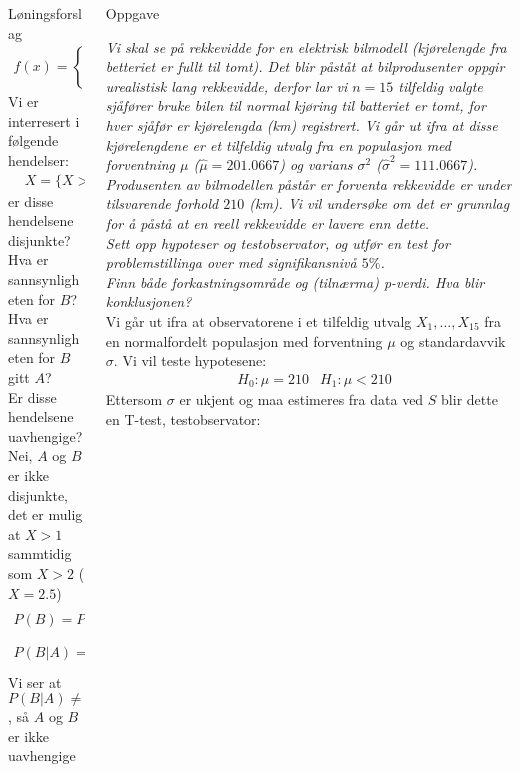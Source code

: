 \documentclass[final,hyperref={pdfpagelabels=false}]{beamer}
\newcommand{\oppgave}[2]
{\center\normalsize Oppgave\\
	{\footnotesize\raggedright \textit{#1}\\#2\\}}
\newcommand{\matte}[1]{\vspace{-3mm}\begin{align*}#1\end{align*}}
\begin{document}
\begin{frame}{}
\begin{columns}[t]
\begin{column}{.33\linewidth}
\begin{block}{Løningsforslag}
{					\matte{f(x)=\begin{cases}
							\frac{2}{9}x,&0<x<3\\
							0,&\text{ellers}
						\end{cases}}
					Vi er interresert i følgende hendelser:
					\matte{&X=\{X>1\} &\text{og}& &B=\{X>2\}}
					er disse hendelsene disjunkte?\\
					Hva er sannsynligheten for $B$?\\
					Hva er sannsynligheten for $B$ gitt $A$?\\
					Er disse hendelsene uavhengige?}
				{Nei, $A$ og $B$ er ikke disjunkte, det er mulig at $X>1$ sammtidig som $X>2$ ($X=2.5$)
					\matte{P(B)=P(X>2)=\int_2^3f(x)\,dx=\int_2^3\frac{2}{9}x\,dx\left[\frac{1}{9}x^2\right]_2^3=1-\frac{4}{9}=\frac{5}{9}\\
						P(B|A)=\frac{P(B\cap A)}{P(A)}=\frac{P(A|B)P(B)}{P(A)}=\frac{1\cdot P(B)}{P(A)}=\frac{\frac{5}{9}}{\int_1^3\frac{1}{9}x\,dx}=\frac{5}{8}}
					Vi ser at $P(B|A)\neq P(B)$, så $A$ og $B$ er ikke uavhengige}
			\end{block}
		\end{column}
		\begin{column}{.33\linewidth}
			\begin{block}{}
				\oppgave{Vi skal se på rekkevidde for en elektrisk bilmodell (kjørelengde fra betteriet er fullt til tomt).
					Det blir påståt at bilprodusenter oppgir urealistisk lang rekkevidde, derfor lar vi $n=15$ tilfeldig valgte sjåfører bruke bilen til normal kjøring til batteriet er tomt, for hver sjåfør er kjørelengda (km) registrert.
					Vi går ut ifra at disse kjørelengdene er et tilfeldig utvalg fra en populasjon med forventning $\mu$ ($\hat \mu=201.0667$) og varians $\sigma^2$ ($\hat \sigma^2 = 111.0667$).
					Produsenten av bilmodellen påstår er forventa rekkevidde er under tilsvarende forhold $210$ (km).
					Vi vil undersøke om det er grunnlag for å påstå at en reell rekkevidde er lavere enn dette.\\
					Sett opp hypoteser og testobservator, og utfør en test for problemstillinga over med signifikansnivå $5\%$.\\
					Finn både forkastningsområde og (tilnærma) p-verdi.
					Hva blir konklusjonen?}
				{Vi går ut ifra at observatorene i et tilfeldig utvalg $X_1,\ldots,X_{15}$ fra en normalfordelt populasjon med forventning $\mu$ og standardavvik $\sigma$.
					Vi vil teste hypotesene:
					\matte{&H_0: \mu=210 &H_1:\mu<210}
					Ettersom $\sigma$ er ukjent og maa estimeres fra data ved $S$ blir dette en T-test, testobservator:
}
\end{block}
\end{column}
\end{columns}
\end{frame}
\end{document}
